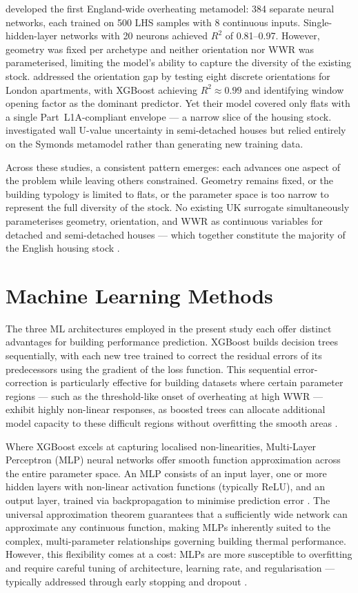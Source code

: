 \documentclass[12pt,a4paper]{report}
\begin{document}
\citet{Symonds2016} developed the first England-wide overheating metamodel: 384 separate neural networks, each trained on 500 LHS samples with 8 continuous inputs. Single-hidden-layer networks with 20 neurons achieved $R^2$ of 0.81--0.97. However, geometry was fixed per archetype and neither orientation nor WWR was parameterised, limiting the model's ability to capture the diversity of the existing stock. \citet{Botti2022} addressed the orientation gap by testing eight discrete orientations for London apartments, with XGBoost achieving $R^2 \approx 0.99$ and identifying window opening factor as the dominant predictor. Yet their model covered only flats with a single Part~L1A-compliant envelope --- a narrow slice of the housing stock. \citet{Petrou2021} investigated wall U-value uncertainty in semi-detached houses but relied entirely on the Symonds metamodel rather than generating new training data.

Across these studies, a consistent pattern emerges: each advances one aspect of the problem while leaving others constrained. Geometry remains fixed, or the building typology is limited to flats, or the parameter space is too narrow to represent the full diversity of the stock. No existing UK surrogate simultaneously parameterises geometry, orientation, and WWR as continuous variables for detached and semi-detached houses --- which together constitute the majority of the English housing stock \citep{EHS2022}.


\section{Machine Learning Methods}
\label{sec:ml-methods}

The three ML architectures employed in the present study each offer distinct advantages for building performance prediction. XGBoost \citep{Chen2016} builds decision trees sequentially, with each new tree trained to correct the residual errors of its predecessors using the gradient of the loss function. This sequential error-correction is particularly effective for building datasets where certain parameter regions --- such as the threshold-like onset of overheating at high WWR --- exhibit highly non-linear responses, as boosted trees can allocate additional model capacity to these difficult regions without overfitting the smooth areas \citep{Botti2022,Shirzadi2025}.

Where XGBoost excels at capturing localised non-linearities, Multi-Layer Perceptron (MLP) neural networks offer smooth function approximation across the entire parameter space. An MLP consists of an input layer, one or more hidden layers with non-linear activation functions (typically ReLU), and an output layer, trained via backpropagation to minimise prediction error \citep{Lawrence2021}. The universal approximation theorem guarantees that a sufficiently wide network can approximate any continuous function, making MLPs inherently suited to the complex, multi-parameter relationships governing building thermal performance. However, this flexibility comes at a cost: MLPs are more susceptible to overfitting and require careful tuning of architecture, learning rate, and regularisation --- typically addressed through early stopping and dropout \citep{Hou2024}.
\end{document}
